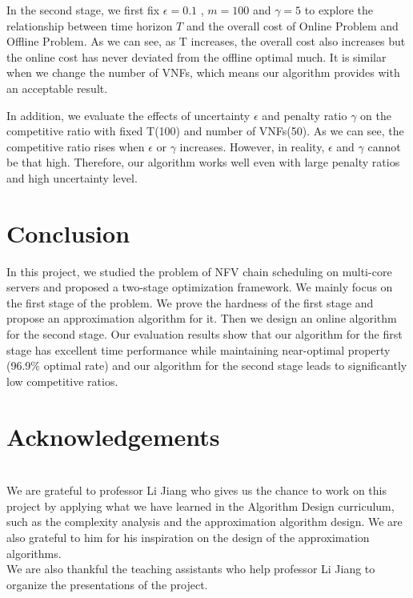 \documentclass{acmtog}
\begin{document}
In the second stage, we first fix $\epsilon =0.1$ , $m= 100$ and $\gamma =5$ to explore the relationship between time horizon $T$ and the overall cost of Online Problem and Offline Problem. As we can see, as T increases, the overall cost also increases but the online cost has never deviated from the offline optimal much. It is similar when we change the number of VNFs, which means our algorithm provides with an acceptable result.

In addition, we evaluate the effects of uncertainty $\epsilon$ and penalty ratio $\gamma$ on the competitive ratio with fixed T(100) and number of VNFs(50). As we can see, the competitive ratio rises when $\epsilon$ or $\gamma$ increases. However, in reality, $\epsilon$ and $\gamma$ cannot be that high. Therefore, our algorithm works well even with large penalty ratios and high uncertainty level.

\section{Conclusion}
In this project, we studied the problem of NFV chain scheduling on multi-core servers and proposed a two-stage optimization framework. We mainly focus on the first stage of the problem. We prove the hardness of the first stage and propose an approximation algorithm for it. Then we design an online algorithm for the second stage. Our evaluation results show that our algorithm for the first stage has excellent time performance while maintaining near-optimal property (96.9$\%$ optimal rate) and our algorithm for the second stage leads to significantly low competitive ratios.




\section{Acknowledgements}
\\\indent We are grateful to professor Li Jiang who gives us the chance to work on this project by applying what we have learned in the Algorithm Design curriculum, such as the complexity analysis and the approximation algorithm design. We are also grateful to him for his inspiration on the design of the approximation algorithms. 
\\\indent We are also thankful the teaching assistants who help professor Li Jiang to organize the presentations of the project. 
\end{document}
